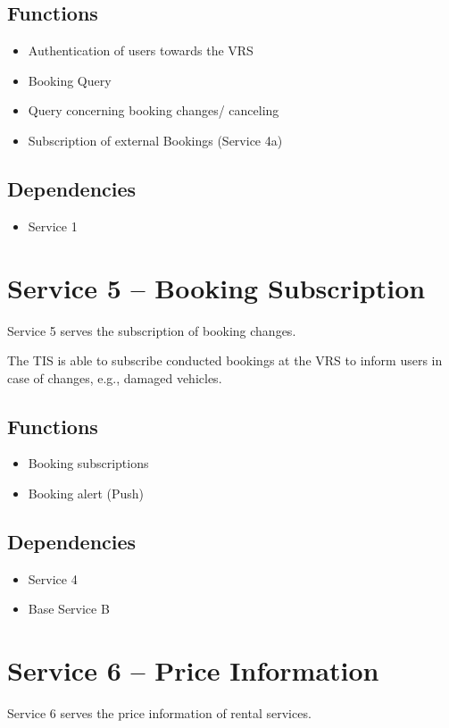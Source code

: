\subsection*{Functions}
\begin{itemize}
\item Authentication of users towards the VRS 
\item Booking Query
\item Query concerning booking changes/ canceling
\item Subscription of external Bookings (Service 4a)
\end{itemize}

\subsection*{Dependencies}
\begin{itemize}
\item Service 1
\end{itemize}

\section{Service 5 -- Booking Subscription}
\label{sec:Hierachiemodell:Dienst5}
Service 5 serves the subscription of booking changes.

The TIS is able to subscribe conducted bookings at the VRS to inform users in case of changes, e.g., damaged vehicles.
\subsection*{Functions}
\begin{itemize}
\item Booking subscriptions 
\item Booking alert (Push)
\end{itemize}

\subsection*{Dependencies}
\begin{itemize}
\item Service 4
\item Base Service B
\end{itemize}

\section{Service 6 -- Price Information}
\label{sec:Hierachiemodell:Dienst6}
Service 6 serves the price information of rental services.


